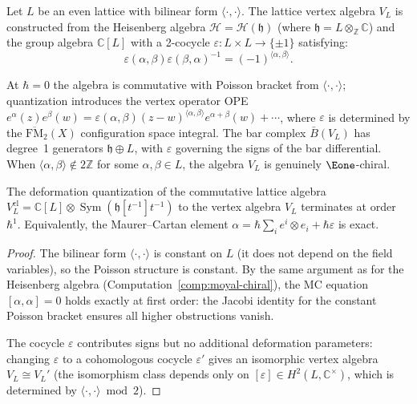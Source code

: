 \begin{computation}
\label{comp:lattice-cocycle-deformation}

Let $L$ be an even lattice with bilinear form $\langle \cdot, \cdot \rangle$.
The lattice vertex algebra $V_L$ is constructed from the Heisenberg
algebra $\mathcal{H} = \mathcal{H}(\mathfrak{h})$ (where $\mathfrak{h} = L \otimes_\mathbb{Z} \mathbb{C}$)
and the group algebra $\mathbb{C}[L]$ with a 2-cocycle
$\varepsilon \colon L \times L \to \{\pm 1\}$ satisfying:
\[
\varepsilon(\alpha, \beta) \varepsilon(\beta, \alpha)^{-1}
= (-1)^{\langle \alpha, \beta \rangle}.
\]

At $\hbar = 0$ the algebra is commutative with Poisson bracket from $\langle\cdot,\cdot\rangle$; quantization introduces the vertex operator OPE $e^\alpha(z)e^\beta(w) = \varepsilon(\alpha,\beta)(z-w)^{\langle\alpha,\beta\rangle}e^{\alpha+\beta}(w)+\cdots$, where $\varepsilon$ is determined by the $\overline{\mathrm{FM}}_2(X)$ configuration space integral. The bar complex $\bar{B}(V_L)$ has degree~1 generators $\mathfrak{h}\oplus L$, with $\varepsilon$ governing the signs of the bar differential. When $\langle\alpha,\beta\rangle\notin 2\mathbb{Z}$ for some $\alpha,\beta\in L$, the algebra $V_L$ is genuinely $\Eone$-chiral.
\end{computation}

\begin{proposition}
\label{prop:lattice-one-step}
The deformation quantization of the commutative lattice algebra
$V_L^{\mathrm{cl}} = \mathbb{C}[L] \otimes \operatorname{Sym}(\mathfrak{h}[t^{-1}]t^{-1})$
to the vertex algebra $V_L$ terminates at order $\hbar^1$.
Equivalently, the Maurer--Cartan element
$\alpha = \hbar \sum_i e^i \otimes e_i + \hbar \varepsilon$
is exact.
\end{proposition}

\begin{proof}
The bilinear form $\langle \cdot, \cdot \rangle$ is constant on $L$
(it does not depend on the field variables), so the Poisson structure
is constant. By the same argument as for the Heisenberg algebra
(Computation~\ref{comp:moyal-chiral}), the MC equation $[\alpha, \alpha] = 0$
holds exactly at first order: the Jacobi identity for the constant
Poisson bracket ensures all higher obstructions vanish.

The cocycle $\varepsilon$ contributes signs but no additional deformation
parameters: changing $\varepsilon$ to a cohomologous cocycle $\varepsilon'$
gives an isomorphic vertex algebra $V_L \cong V_L'$ (the isomorphism
class depends only on $[\varepsilon] \in H^2(L, \mathbb{C}^\times)$,
which is determined by $\langle \cdot, \cdot \rangle \bmod 2$).
\end{proof}


